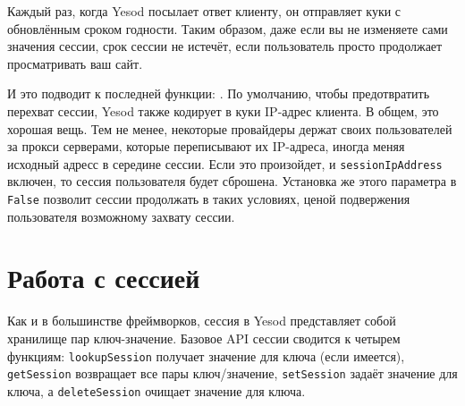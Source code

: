 \begin{remark}
Каждый раз, когда Yesod посылает ответ клиенту, он отправляет куки с обновлённым сроком годности. Таким образом, даже если вы не изменяете сами значения сессии, срок сессии не истечёт, если пользователь просто продолжает просматривать ваш сайт.
\end{remark}

И это подводит к последней функции: . По умолчанию, чтобы предотвратить перехват сессии, Yesod также кодирует в куки IP-адрес клиента. В общем, это хорошая вещь. Тем не менее, некоторые провайдеры держат своих пользователей за прокси серверами, которые переписывают их IP-адреса, иногда меняя исходный адресс в середине сессии. Если это произойдет, и \lstinline'sessionIpAddress' включен, то сессия пользователя будет сброшена. Установка же этого параметра в \lstinline'False' позволит сессии продолжать в таких условиях, ценой подвержения пользователя возможному захвату сессии.

\section{Работа с сессией}

Как и в большинстве фреймворков, сессия в Yesod представляет собой хранилище пар ключ-значение. Базовое API сессии сводится к четырем функциям: \lstinline'lookupSession' получает значение для ключа (если имеется), \lstinline'getSession' возвращает все пары ключ/значение, \lstinline'setSession' задаёт значение для ключа, а \lstinline'deleteSession' очищает значение для ключа.

